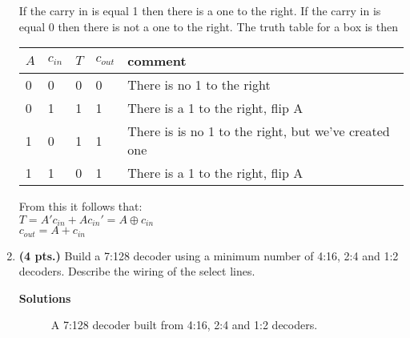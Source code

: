 \begin{enumerate}
\begin{onlysolution}
{                        If the carry in is equal 1 then there is a one to the right.
                        If the carry in is equal 0 then there is not a one to the right.
                        The truth table for a box is then

                        \begin{table}
                            \begin{tabular}{l|l||l|l|l}
                                $A$ & $c_{in}$  & $T$ & $c_{out}$ & comment \\ \hline
                                0   & 0       &   0 & 0          & There is no 1 to the right \\ \hline
                                0   & 1       &   1 & 1          & There is a 1 to the right, flip A \\ \hline
                                1   & 0       &   1 & 1          & There is is no 1 to the right, but we've
                                created one \\ \hline
                                1   & 1       &   0 & 1          & There is a 1 to the right, flip A \\
                            \end{tabular}
                        \end{table}

                        From this it follows that: \\
                        $T=A'c_{in} + A c_{in}'=A \oplus c_{in}$ \\
                        $c_{out} = A + c_{in}$
                    }
                \end{onlysolution}

            \item \textbf{ (4 pts.)} Build a 7:128 decoder using a minimum number of
                4:16, 2:4 and 1:2 decoders. Describe the wiring of the select lines.
                \begin{onlysolution} \textbf{Solutions} \itshape {

                        \begin{figure}[ht]
                            \caption{A 7:128 decoder built from 4:16, 2:4 and 1:2 decoders.}
                            \label{fig:bighwdec}
                        \end{figure}
                    }
                \end{onlysolution}


\end{enumerate}
